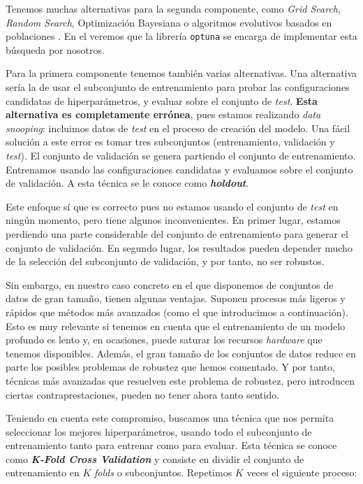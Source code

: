 Tenemos muchas alternativas para la segunda componente, como \textit{Grid Search}, \textit{Random Search}, Optimización Bayesiana o algoritmos evolutivos basados en poblaciones \cite{informatica:review_algoritmos_hp}. En el  veremos que la librería \lstinline{optuna} se encarga de implementar esta búsqueda por nosotros.

Para la primera componente tenemos también varias alternativas. Una alternativa sería la de usar el subconjunto de entrenamiento para probar las configuraciones candidatas de hiperparámetros, y evaluar sobre el conjunto de \textit{test}. \textbf{Esta alternativa es completamente errónea}, pues estamos realizando \textit{data snooping}: incluimos datos de \textit{test} en el proceso de creación del modelo. Una fácil solución a este error es tomar tres subconjuntos (entrenamiento, validación y \textit{test}). El conjunto de validación se genera partiendo el conjunto de entrenamiento. Entrenamos usando las configuraciones candidatas y evaluamos sobre el conjunto de validación. A esta técnica se le conoce como \textbf{\textit{holdout}}.

Este enfoque sí que es correcto pues no estamos usando el conjunto de \textit{test} en ningún momento, pero tiene algunos inconvenientes. En primer lugar, estamos perdiendo una parte considerable del conjunto de entrenamiento para generar el conjunto de validación. En segundo lugar, los resultados pueden depender mucho de la selección del subconjunto de validación, y por tanto, no ser robustos.

Sin embargo, en nuestro caso concreto en el que disponemos de conjuntos de datos de gran tamaño, tienen algunas ventajas. Suponen procesos más ligeros y rápidos que métodos más avanzados (como el que introducimos a continuación). Esto es muy relevante si tenemos en cuenta que el entrenamiento de un modelo profundo es lento y, en ocasiones, puede saturar los recursos \textit{hardware} que tenemos disponibles. Además, el gran tamaño de los conjuntos de datos reduce en parte los posibles problemas de robustez que hemos comentado. Y por tanto, técnicas más avanzadas que resuelven este problema de robustez, pero introducen ciertas contraprestaciones, pueden no tener ahora tanto sentido.

Teniendo en cuenta este compromiso, buscamos una técnica que nos permita seleccionar los mejores hiperparámetros, usando todo el subconjunto de entrenamiento tanto para entrenar como para evaluar. Esta técnica se conoce como \textbf{\textit{K-Fold Cross Validation}} \cite{informatica:kfold_cross_val_paper} y consiste en dividir el conjunto de entrenamiento en $K$ \textit{folds} o subconjuntos. Repetimos $K$ veces el siguiente proceso:


